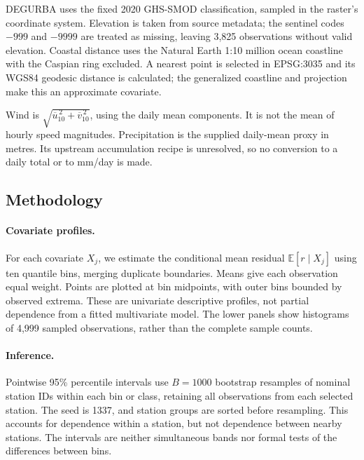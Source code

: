 \documentclass[a4paper,12pt,leqno]{article}
\begin{document}
DEGURBA uses the fixed 2020 GHS-SMOD classification, sampled in the raster's
coordinate system. Elevation is taken from source metadata; the sentinel
codes $-999$ and $-9999$ are treated as missing, leaving 3,825 observations
without valid elevation. Coastal distance uses the Natural Earth 1:10
million ocean coastline with the Caspian ring excluded. A nearest point
is selected in EPSG:3035 and its WGS84 geodesic distance is calculated;
the generalized coastline and projection make this an approximate covariate.

Wind is $\sqrt{\overline{u}_{10}^{\,2}+\overline{v}_{10}^{\,2}}$, using
the daily mean components. It is not the mean of hourly speed magnitudes.
Precipitation is the supplied daily-mean proxy in metres. Its upstream
accumulation recipe is unresolved, so no conversion to a daily total or
to mm/day is made.






\subsection{Methodology}
\label{sec:methods}

\paragraph{Covariate profiles.} For each covariate $X_j$, we estimate the
conditional mean residual $\mathbb{E}[r\mid X_j]$ using ten quantile bins,
merging duplicate boundaries. Means give each observation equal weight.
Points are plotted at bin midpoints, with outer bins bounded by observed
extrema. These are univariate descriptive profiles, not partial dependence
from a fitted multivariate model. The lower panels show histograms of
4,999 sampled observations, rather than the complete sample counts.

\paragraph{Inference.} Pointwise 95\% percentile intervals use $B=1000$
bootstrap resamples of nominal station IDs within each bin or class,
retaining all observations from each selected station. The seed is 1337,
and station groups are sorted before resampling. This accounts for
dependence within a station, but not dependence between nearby stations.
The intervals are neither simultaneous bands nor formal tests of the
differences between bins.
\end{document}
